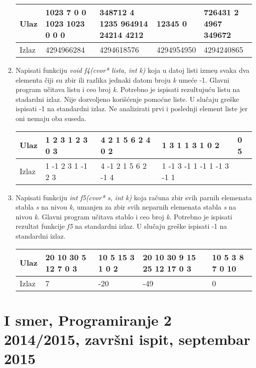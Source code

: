 \begin{enumerate}
\small
\begin{tabular}{ |l|l|l|l|l| }
\hline
  Ulaz & 1023 7 0 0 1023 1023 0 0 0 & 348712 4 1235 964914 24214 4212 & 12345 0 &726431 2 4967 349672 \\ \hline
  Izlaz & 4294966284 & 4294618576 & 4294954950 & 4294240865\\ \hline
\end{tabular}
\normalsize

\item
Napisati funkciju \emph{void f4(cvor* lista, int k)} koja u datoj listi izme\d u svaka dva elementa
\v ciji su zbir ili razlika jednaki datom broju \emph{k} ume\' ce -1. Glavni program u\v citava listu i ceo broj \emph{k}.
Potrebno je ispisati rezultuju\' cu listu na stadardni izlaz. Nije dozvoljeno kori\v s\'cenje pomo\'cne liste. U slu\v caju gre\v ske ispisati -1 na standardni izlaz.
Ne analizirati prvi i poslednji element liste jer oni nemaju oba suseda.

\small
\begin{tabular}{ |l|l|l|l|l| }
\hline
  Ulaz & 1 2 3 1 2 3 0 3 & 4 2 1 5 6 2 4 0 2 & 1 3 1 1 3 1 0 2 & 0 5 \\ \hline
  Izlaz & 1 -1 2 3 1 -1 2 3 & 4 -1 2 1 5 6 2 -1 4 & 1 -1 3 -1 1 -1 1 -1 3 -1 1 & \\ \hline
\end{tabular}
\normalsize

\item
Napisati funkciju \emph{int f5(cvor* s, int k)} koja ra\v cuna zbir svih parnih elemenata stabla \emph{s} na nivou \emph{k}, umanjen za zbir svih neparnih elemenata stabla \emph{s} na nivou \emph{k}.
Glavni program u\v citava stablo i ceo broj \emph{k}. Potrebno je ispisati rezultat funkcije \emph{f5} na standardni izlaz. U slu\v caju gre\v ske ispisati -1 na standardni izlaz.

\small
\begin{tabular}{ |l|l|l|l|l| }
\hline
  Ulaz &
  20 10 30 5 12 7 0 3&
  10 5 15 3 1 0 2&
  20 10 30 9 15 25 12 17 0 3&
  10 5 3 8 7 0 10\\ \hline
  Izlaz &
  7&
  -20&
  -49&
  0\\ \hline
\end{tabular}
\normalsize

\end{enumerate}


\section{I smer, Programiranje 2 2014/2015, zavr\v{s}ni ispit, septembar 2015}


